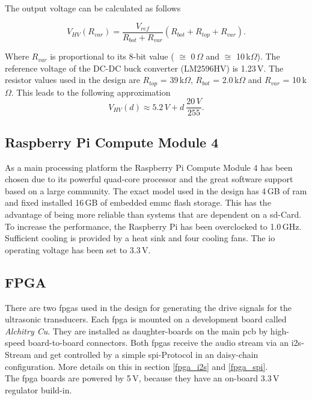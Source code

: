 The output voltage can be calculated as follows

\begin{equation}
    V_{HV}(R_{var}) = \frac{V_{ref}}{R_{bot} + R_{var}} (R_{bot} + R_{top} + R_{var}).
\end{equation}

Where $R_{var}$ is proportional to its 8-bit value ( $\cong$ 0\,$\Omega$ and  $\cong$ 10\,k$\Omega$). The reference voltage of the DC-DC buck converter (LM2596HV) is 1.23\,V. The resistor values used in the design are $R_{top}$ = 39\,k$\Omega$, $R_{bot}$ = 2.0\,k$\Omega$ and $R_{var}$ = 10\,k$\Omega$. This leads to the following approximation
 \begin{equation}
    V_{HV}(d) \approx 5.2\,V + d\:\frac{20\,V}{255}.
\end{equation}

\subsection{Raspberry Pi Compute Module 4}
As a main processing platform the Raspberry Pi Compute Module 4 has been chosen due to its powerful quad-core processor and the great software support based on a large community. The exact model used in the design has 4\,GB of \acrshort{ram} and fixed installed 16\,GB of embedded \acrshort{emmc} flash storage. This has the advantage of being more reliable than systems that are dependent on a \acrshort{sd}-Card.
To increase the performance, the Raspberry Pi has been overclocked to 1.0\,GHz. Sufficient cooling is provided by a heat sink and four cooling fans.
The \acrshort{io} operating voltage has been set to 3.3\,V.

\subsection{FPGA} \label{hardware_fpga}
There are two \acrshort{fpga}s used in the design for generating the drive signals for the ultrasonic transducers. Each \acrshort{fpga} is mounted on a development board called \textit{Alchitry Cu}. They are installed as daughter-boards on the main \acrshort{pcb} by high-speed board-to-board connectors. Both \acrshort{fpga}s receive the audio stream via an \acrshort{i2s}-Stream and get controlled by a simple \acrshort{spi}-Protocol in an daisy-chain configuration. More details on this in section \ref{fpga_i2s} and \ref{fpga_spi}.\\
The \acrshort{fpga} boards are powered by 5\,V, because they have an on-board 3.3\,V regulator build-in.


